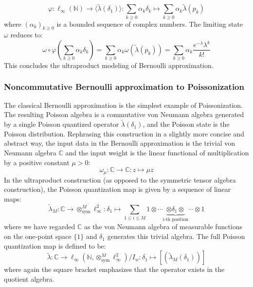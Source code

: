 \documentclass[a4paper,11pt]{article}
\theoremstyle{definition}
\numberwithin{equation}{section}
\begin{document}
\begin{equation}
    \varphi:\ell_\infty(\mathbb{N})\rightarrow \langle\widetilde{\lambda}(\delta_1)\rangle:\sum_{k\geq 0}\alpha_k\delta_k\mapsto\sum_{k\geq 0}\alpha_k\widetilde{\lambda}(p_k)
\end{equation}
where $(\alpha_k)_{k\geq 0}$ is a bounded sequence of complex numbers. The limiting state $\omega$ reduces to:
\begin{equation*}
    \omega\circ\varphi(\sum_{k\geq 0}\alpha_k\delta_k) = \sum_{k\geq 0}\alpha_k \omega(\widetilde{\lambda}(p_k)) = \sum_{k\geq 0}\alpha_k \frac{e^{-\lambda}\lambda^k}{k!}
\end{equation*}
This concludes the ultraproduct modeling of Bernoulli approximation.
\subsubsection{Noncommutative Bernoulli approximation to Poissonization}\label{subsubsection:general}
The classical Bernoulli approximation is the simplest example of Poissonization. The resulting Poisson algebra is a commutative von Neumann algebra generated by a single Poisson quantized operator $\widetilde{\lambda}(\delta_1)$, and the Poisson state is the Poisson distribution. Rephrasing this construction in a slightly more concise and abstract way, the input data in the Bernoulli approximation is the trivial von Neumann algebra $\mathbb{C}$ and the input weight is the linear functional of multiplication by a positive constant $\mu > 0$:
\begin{equation}
    \omega_\mu:\mathbb{C}\rightarrow\mathbb{C}:z\mapsto \mu z
\end{equation}
In the ultraproduct construction (as opposed to the symmetric tensor algebra construction), the Poisson quantization map is given by a sequence of linear maps:
\begin{equation}
    \widetilde{\lambda}_M:\mathbb{C}\rightarrow \otimes_\text{sym}^M\ell_\infty^2:\delta_1\mapsto \sum_{1\leq i\leq M}1\otimes\cdots\underbrace{\otimes \delta_1\otimes}_\text{i-th position}\cdots\otimes 1
\end{equation}
where we have regarded $\mathbb{C}$ as the von Neumann algebra of measurable functions on the one-point space $\{1\}$ and $\delta_1$ generates this trivial algebra. The full Poisson quantization map is defined to be:
\begin{equation}
    \widetilde{\lambda}:\mathbb{C}\rightarrow \ell_\infty(\mathbb{N}, \otimes_\text{sym}^M\ell_\infty^2)/I_w: \delta_1\mapsto [(\widetilde{\lambda}_M(\delta_1))]
\end{equation}
where again the square bracket emphasizes that the operator exists in the quotient algebra.
\end{document}
